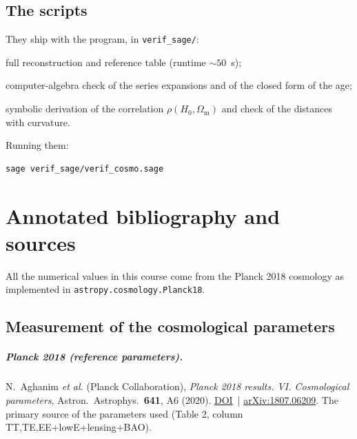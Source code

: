 \documentclass[11pt,a4paper,openany]{report}
\newcommand{\Hzero}{H_{0}}
\newcommand{\Om}{\Omega_{\mathrm{m}}}
\begin{document}
\section{The scripts}

They ship with the program, in \texttt{verif\_sage/}:

\begin{description}[leftmargin=3.6cm,labelwidth=3.4cm]
\item[\texttt{verif\_cosmo.sage}] full reconstruction and reference table
(runtime $\sim 50$~s);
\item[\texttt{verif\_DL\_symbolique.sage}] computer-algebra check of the series
expansions and of the closed form of the age;
\item[\texttt{verif\_courbure\_sigma.sage}] symbolic derivation of the
correlation $\rho(\Hzero,\Om)$ and check of the distances with curvature.
\end{description}

\noindent Running them:
\begin{verbatim}
sage verif_sage/verif_cosmo.sage
\end{verbatim}

\chapter{Annotated bibliography and sources}
\label{chap:biblio}

All the numerical values in this course come from the Planck 2018 cosmology as
implemented in \texttt{astropy.cosmology.Planck18}.

\section{Measurement of the cosmological parameters}

\paragraph{Planck 2018 (reference parameters).}
N.~Aghanim \emph{et al.} (Planck Collaboration), \emph{Planck 2018 results.
VI. Cosmological parameters}, Astron.\ Astrophys.\ \textbf{641}, A6 (2020).
\href{https://doi.org/10.1051/0004-6361/201833910}{DOI}~|
\href{https://arxiv.org/abs/1807.06209}{arXiv:1807.06209}.
The primary source of the parameters used (Table 2, column
TT,TE,EE+lowE+lensing+BAO).
\end{document}
